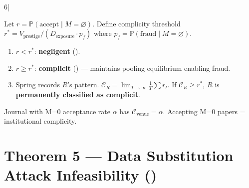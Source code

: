 6|\documentclass[12pt,a4paper]{article}
\begin{document}
\begin{theorem}[]
\label{thm:reviewer-complicity}
\rigorFull
Let $r = \mathbb{P}(\text{accept} \mid M=\varnothing)$. Define complicity threshold $r^* = V_{\text{prestige}} / (D_{\text{exposure}} \cdot p_f)$ where $p_f = \mathbb{P}(\text{fraud} \mid M=\varnothing)$.
\begin{enumerate}[label=(\roman*)]
    \item $r < r^*$: \textbf{negligent} ().
    \item $r \ge r^*$: \textbf{complicit} () — maintains pooling equilibrium enabling fraud.
    \item Spring records $R$'s pattern. $\mathcal{C}_R = \lim_{T\to\infty} \frac{1}{T}\sum r_t$. If $\mathcal{C}_R \ge r^*$, $R$ is \textbf{permanently classified as complicit}.
\end{enumerate}
\end{theorem}

\begin{corollary}[]
Journal with M=0 acceptance rate $\alpha$ has $\mathcal{C}_{\text{venue}} = \alpha$. Accepting M=0 papers = institutional complicity.
\end{corollary}

\section{Theorem 5 — Data Substitution Attack Infeasibility  ()}
\label{sec:thm5}
\end{document}
